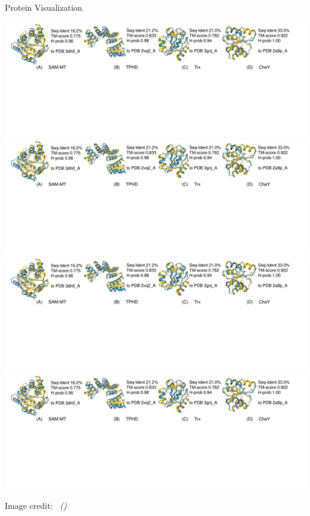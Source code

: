 \documentclass[dvipsnames,
hyperref={colorlinks,citecolor=black}
]{beamer}
\newcommand{\credit}[2]{\par\hfill \tiny #1 credit:~\itshape\citeauthor{#2} (\citeyear{#2})}
\begin{document}
\begin{frame}{Protein Visualization}
	\begin{center}
		\includegraphics[trim={0 0 90em 0},clip,scale=0.4]{images/protein_visualization.pdf}
		\includegraphics[trim={31.5em 0 57.4em 0},clip,scale=0.4]{images/protein_visualization.pdf}
		\includegraphics[trim={64em 0 30em 0},clip,scale=0.4]{images/protein_visualization.pdf}
		\includegraphics[trim={92em 0 0 0},clip,scale=0.4]{images/protein_visualization.pdf}
	\end{center}
	\credit{Image}{lv2024prollama}
\end{frame}
\end{document}
